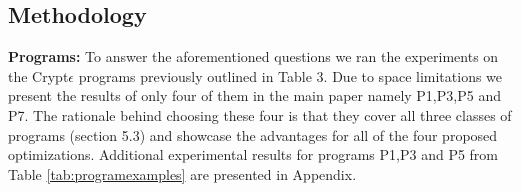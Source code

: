 \subsection{Methodology} 
\textbf{Programs:}
To answer the aforementioned questions we ran the experiments on the Crypt$\epsilon$ programs previously outlined in Table 3. Due to space limitations we present the results of only four of them in the main paper namely P1,P3,P5 and P7. The rationale behind choosing these four is that they cover all three classes of programs (section 5.3) and showcase the advantages for all of the four proposed optimizations. %
Additional experimental results for programs P1,P3 and P5 from Table \ref{tab:programexamples} are presented in Appendix.%
